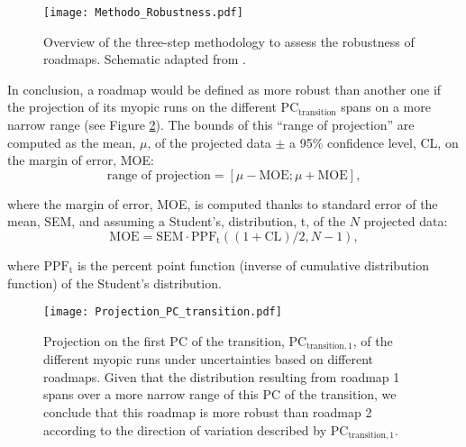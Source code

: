 \begin{figure}[!htbp]
\centering
\texttt{[image: Methodo\_Robustness.pdf]}
\caption{Overview of the three-step methodology to assess the robustness of roadmaps. Schematic adapted from \cite{moret2020overcapacity}.}
\label{fig:Methodo_Robustness}
\end{figure}

In conclusion, a roadmap would be defined as more robust than another one if the projection of its myopic runs on the different $\text{PC}_{\text{transition}}$ spans on a more narrow range (see Figure \ref{fig:Projection_PC_transition}). The bounds of this ``range of projection'' are computed as the mean, $\mu$, of the projected data $\pm$ a 95\% confidence level, CL, on the margin of error, MOE:
$$
\text{range of projection} = [\mu-\mathrm{MOE}; \mu + \mathrm{MOE}],
$$

\noindent
where the margin of error, MOE,  is computed thanks to standard error of the mean, SEM, and assuming a Student's, distribution, t,  of the $N$ projected data:
$$
\text{MOE} = \mathrm{SEM}\cdot \mathrm{PPF}_{\mathrm{t}}\left((1+\mathrm{CL})/2,N-1\right),
$$

\noindent
where $\mathrm{PPF}_{\mathrm{t}}$ is the percent point function (\ie inverse of cumulative distribution function) of the Student's distribution.

\begin{figure}[!htbp]
\centering
\texttt{[image: Projection\_PC\_transition.pdf]}
\caption{Projection on the first PC of the transition, $\text{PC}_{\text{transition},1}$, of the different myopic runs under uncertainties based on different roadmaps. Given that the distribution resulting from roadmap 1 spans over a more narrow range of this PC of the transition, we conclude that this roadmap is more robust than roadmap 2 according to the direction of variation described by $\text{PC}_{\text{transition},1}$.}
\label{fig:Projection_PC_transition}
\end{figure}

